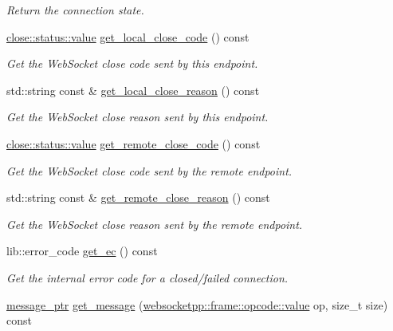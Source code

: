 \begin{DoxyCompactItemize}
\begin{DoxyCompactList}\small\item\em Return the connection state. \end{DoxyCompactList}\item 
\hyperlink{namespacewebsocketpp_1_1close_1_1status_a8614a5c4733d708e2d2a32191c5bef84}{close\+::status\+::value} \hyperlink{classwebsocketpp_1_1connection_a5ec4357a56f7c4648ff01018eecf20ff}{get\+\_\+local\+\_\+close\+\_\+code} () const 
\begin{DoxyCompactList}\small\item\em Get the Web\+Socket close code sent by this endpoint. \end{DoxyCompactList}\item 
std\+::string const \& \hyperlink{classwebsocketpp_1_1connection_a091cd6ee2f87250a39a751a2c4454bb8}{get\+\_\+local\+\_\+close\+\_\+reason} () const 
\begin{DoxyCompactList}\small\item\em Get the Web\+Socket close reason sent by this endpoint. \end{DoxyCompactList}\item 
\hyperlink{namespacewebsocketpp_1_1close_1_1status_a8614a5c4733d708e2d2a32191c5bef84}{close\+::status\+::value} \hyperlink{classwebsocketpp_1_1connection_a51b293d37bbe93b42a4bd177f1c63c62}{get\+\_\+remote\+\_\+close\+\_\+code} () const 
\begin{DoxyCompactList}\small\item\em Get the Web\+Socket close code sent by the remote endpoint. \end{DoxyCompactList}\item 
std\+::string const \& \hyperlink{classwebsocketpp_1_1connection_a7addd86cf19f58f40e7b9c1d5fa6d449}{get\+\_\+remote\+\_\+close\+\_\+reason} () const 
\begin{DoxyCompactList}\small\item\em Get the Web\+Socket close reason sent by the remote endpoint. \end{DoxyCompactList}\item 
lib\+::error\+\_\+code \hyperlink{classwebsocketpp_1_1connection_af8bd0b7a30137a43a98fa7f4719675bf}{get\+\_\+ec} () const 
\begin{DoxyCompactList}\small\item\em Get the internal error code for a closed/failed connection. \end{DoxyCompactList}\item 
\hyperlink{classwebsocketpp_1_1connection_a3b98c091caf54540024538d2394ffb57}{message\+\_\+ptr} \hyperlink{classwebsocketpp_1_1connection_a9f68a0bf3af6478f0f796ce748e35068}{get\+\_\+message} (\hyperlink{namespacewebsocketpp_1_1frame_1_1opcode_ae68711643096dfc4af6d66ade3f9fd5e}{websocketpp\+::frame\+::opcode\+::value} op, size\+\_\+t size) const 

\end{DoxyCompactItemize}
